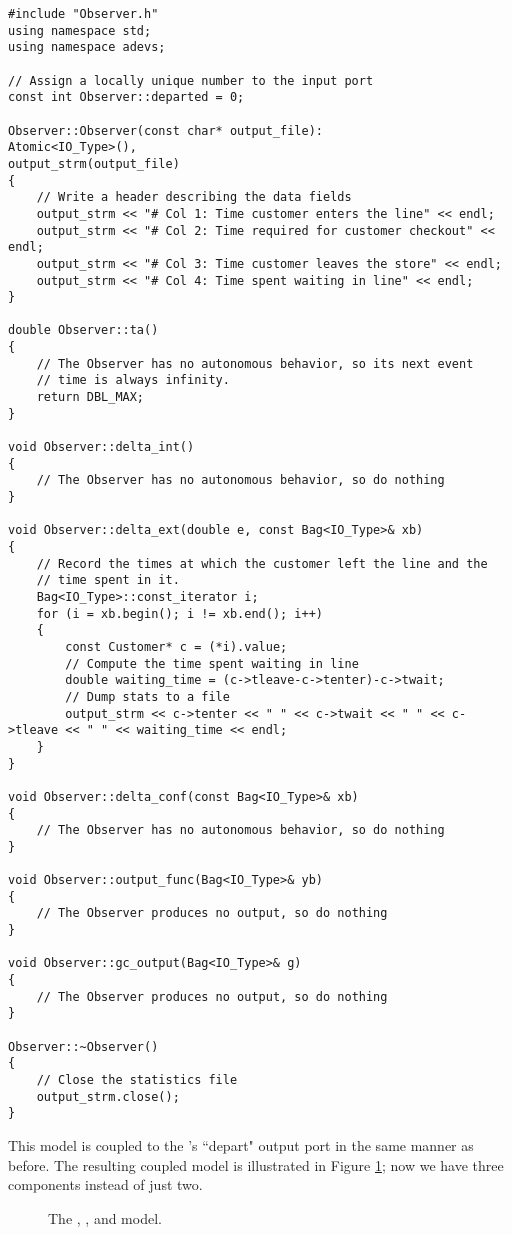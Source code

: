 \begin{verbatim}
#include "Observer.h"
using namespace std;
using namespace adevs;

// Assign a locally unique number to the input port
const int Observer::departed = 0;

Observer::Observer(const char* output_file):
Atomic<IO_Type>(),
output_strm(output_file)
{
    // Write a header describing the data fields
    output_strm << "# Col 1: Time customer enters the line" << endl;
    output_strm << "# Col 2: Time required for customer checkout" << endl;
    output_strm << "# Col 3: Time customer leaves the store" << endl;
    output_strm << "# Col 4: Time spent waiting in line" << endl;
}

double Observer::ta()
{
    // The Observer has no autonomous behavior, so its next event
    // time is always infinity.
    return DBL_MAX;
}

void Observer::delta_int()
{
    // The Observer has no autonomous behavior, so do nothing
}

void Observer::delta_ext(double e, const Bag<IO_Type>& xb)
{
    // Record the times at which the customer left the line and the
    // time spent in it.
    Bag<IO_Type>::const_iterator i;
    for (i = xb.begin(); i != xb.end(); i++)
    {
        const Customer* c = (*i).value;
        // Compute the time spent waiting in line 
        double waiting_time = (c->tleave-c->tenter)-c->twait;
        // Dump stats to a file
        output_strm << c->tenter << " " << c->twait << " " << c->tleave << " " << waiting_time << endl;
    }
}

void Observer::delta_conf(const Bag<IO_Type>& xb)
{
    // The Observer has no autonomous behavior, so do nothing
}

void Observer::output_func(Bag<IO_Type>& yb)
{
    // The Observer produces no output, so do nothing
}

void Observer::gc_output(Bag<IO_Type>& g)
{
    // The Observer produces no output, so do nothing
}

Observer::~Observer()
{
    // Close the statistics file
    output_strm.close();
}
\end{verbatim}

This model is coupled to the 's ``depart" output port in the same manner as before. The resulting coupled model is illustrated in Figure \ref{fig:complete_store_model}; now we have three components instead of just two.
\begin{figure}[ht]
\centering
{}
\caption{The , , and  model.} 
\label{fig:complete_store_model}
\end{figure}

